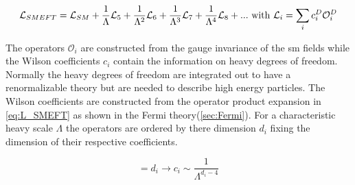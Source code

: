 \documentclass[../Bachelorarbeit.tex]{subfiles}
\begin{document}
\begin{equation}
    \mathcal{L}_{SMEFT} = \mathcal{L}_{SM} + \frac{1}{\Lambda} \mathcal{L}_{5} + \frac{1}{\Lambda^2} \mathcal{L}_{6} + \frac{1}{\Lambda^3} \mathcal{L}_{7} + \frac{1}{\Lambda^4} \mathcal{L}_{8} + ... \textnormal{ with } \mathcal{L}_{i} = \sum_{i} c_{i}^{D} \mathcal{O}_{i}^{D}
    \label{eq:L_SMEFT}
\end{equation}

The operators $\mathcal{O}_{i}$ are constructed from the gauge invariance of the \acrshort{sm} fields while the Wilson coefficients $c_{i}$ contain the information on heavy degrees of freedom.
Normally the heavy degrees of freedom are integrated out to have a renormalizable theory but are needed to describe high energy particles.
The Wilson coefficients are constructed from the operator product expansion in \ref{eq:L_SMEFT} as shown in the Fermi theory(\ref{sec:Fermi}).
For a characteristic heavy scale $\Lambda$ the operators are ordered by there dimension $d_{i}$ fixing the dimension of their respective coefficients.

\begin{equation}
    [\mathcal{O}_i] = d_{i} \longrightarrow c_{i} \sim \frac{1}{\Lambda^{d_{i}-4}}
\end{equation}
\end{document}
